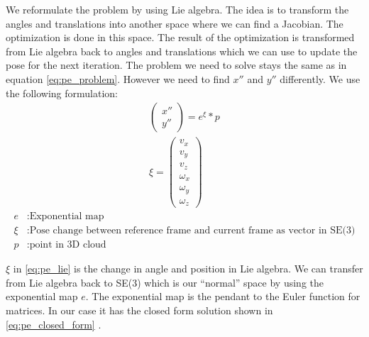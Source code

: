\documentclass[11pt,a4paper,titlepage,oneside]{report}
\begin{document}
We reformulate the problem by using Lie algebra. The idea is to transform the angles and translations into another space where we can find a Jacobian. The optimization is done in this space. The result of the optimization is transformed from Lie algebra back to angles and translations which we can use to update the pose for the next iteration. The problem we need to solve stays the same as in equation \ref{eq:pe_problem}. However we need to find $x''$ and $y''$ differently. We use the following formulation:
\begin{equation}\label{eq:pe_lie}
	\begin{gathered}
		\begin{pmatrix}
			x''\\
			y''
		\end{pmatrix}
		=e^{\xi}*p\\
		\xi=\begin{pmatrix}
			v_x\\
			v_y\\
			v_z\\
			\omega_x\\
			\omega_y\\
			\omega_z
		\end{pmatrix}
	\end{gathered}
\end{equation}
\begin{align*}
	e			&:	\text{Exponential map}\\
	\xi		&:	\text{Pose change between reference frame and current frame as vector in SE(3)}\\
	p			&:	\text{point in 3D cloud}
\end{align*}

$\xi$ in \ref{eq:pe_lie} is the change in angle and position in Lie algebra. We can transfer from Lie algebra back to SE(3) which is our ``normal'' space by using the exponential map $e$. The exponential map is the pendant to the Euler function for matrices. In our case it has the closed form solution shown in \ref{eq:pe_closed_form} \cite{rvc}.
\end{document}
